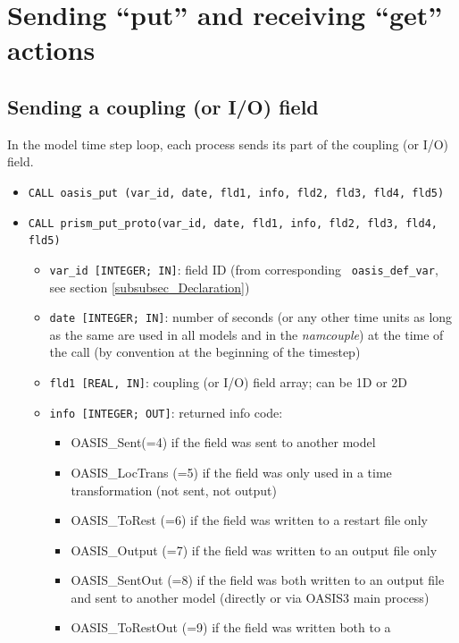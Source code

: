 
\section{Sending ``put'' and receiving ``get'' actions}
\label{subsubsec_sendingreceiving}

\subsection{Sending a coupling (or I/O) field}
\label{prismput}

In the model time step loop, each process sends its part of the
coupling (or I/O) field.

\begin{itemize}
\item {\tt CALL oasis\_put (var\_id, date, fld1, info, fld2, fld3,
    fld4, fld5)}
\item {\tt CALL prism\_put\_proto(var\_id, date, fld1, info, fld2,
    fld3, fld4, fld5)}
  \begin{itemize}
  \item {\tt var\_id [INTEGER; IN]}: field ID (from corresponding {\tt
      oasis\_def\_var}, see section \ref{subsubsec_Declaration})
  \item {\tt date [INTEGER; IN]}: number of seconds (or any other time
    units as long as the same are used in all models and in the {\it
      namcouple}) at the time of the call (by convention at the
    beginning of the timestep)
  \item {\tt fld1 [REAL, IN]}: coupling (or I/O) field array; can be
    1D or 2D
  \item {\tt info [INTEGER; OUT]}: returned info code:
    \begin{itemize}
    \item OASIS\_Sent(=4) if the field was sent to another model
    \item OASIS\_LocTrans (=5) if the field was only used in a time
      transformation (not sent, not output)
    \item OASIS\_ToRest (=6) if the field was written to a restart
      file only
    \item OASIS\_Output (=7) if the field was written to an output
      file only
    \item OASIS\_SentOut (=8) if the field was both written to an
      output file and sent to another model (directly or via OASIS3
      main process)
    \item OASIS\_ToRestOut (=9) if the field was written both to a

\end{itemize}
\end{itemize}
\end{itemize}
